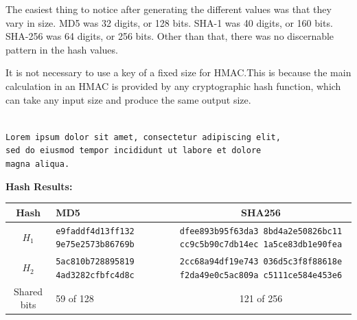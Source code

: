 \documentclass[12pt,largemargins]{homework}
\newcommand{\code}{\texttt}
\begin{document}
\maketitle

The easiest thing to notice after generating the different values was that
they vary in size. MD5 was 32 digits, or 128 bits. SHA-1 was 40 digits, or
160 bits. SHA-256 was 64 digits, or 256 bits. Other than that, there was no
discernable pattern in the hash values.

It is not necessary to use a key of a fixed size for HMAC.\@ This is because the
main calculation in an HMAC is provided by any cryptographic hash function,
which can take any input size and produce the same output size.

\begin{alphaparts}
    \\\code{Lorem ipsum dolor sit amet, consectetur adipiscing elit,
    \\sed do eiusmod tempor incididunt ut labore et dolore
    \\magna aliqua.}

    \textbf{Hash Results:}
    \begin{center}
    \begin{tabular}{|c|M|S|}\hline
        \textbf{Hash} & \textbf{MD5} & \textbf{SHA256} \\\hline
        $H_1$ & \code{e9faddf4d13ff132 9e75e2573b86769b} & \code{dfee893b95f63da3
        8bd4a2e50826bc11 cc9c5b90c7db14ec 1a5ce83db1e90fea}\\\hline
        $H_2$ & \code{5ac810b728895819 4ad3282cfbfc4d8c} & \code{2cc68a94df19e743
        036d5c3f8f88618e f2da49e0c5ac809a c5111ce584e453e6}\\\hline
        Shared bits & 59 of 128 & 121 of 256 \\\hline
    \end{tabular}
    \end{center}
\end{alphaparts}

\begin{alphaparts}
\end{alphaparts}
\end{document}
